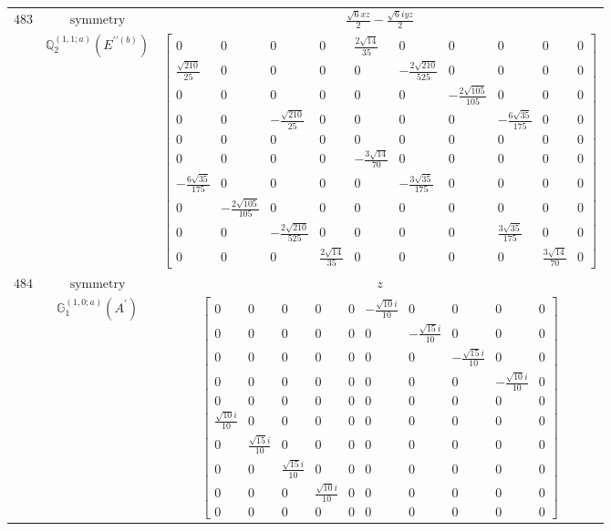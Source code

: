 \documentclass[fleqn,8pt,landscape]{jsarticle}
\begin{document}
\begin{longtable}{ccc}
$ 483 $ & $ \text{symmetry} $ & $ \frac{\sqrt{6} x z}{2} - \frac{\sqrt{6} i y z}{2} $ \\
$  $ & $ \mathbb{Q}_{2}^{(1,1;a)}(E^{\prime\prime(b)}) $ & $ \begin{bmatrix} 0 & 0 & 0 & 0 & \frac{2 \sqrt{14}}{35} & 0 & 0 & 0 & 0 & 0 \\ \frac{\sqrt{210}}{25} & 0 & 0 & 0 & 0 & - \frac{2 \sqrt{210}}{525} & 0 & 0 & 0 & 0 \\ 0 & 0 & 0 & 0 & 0 & 0 & - \frac{2 \sqrt{105}}{105} & 0 & 0 & 0 \\ 0 & 0 & - \frac{\sqrt{210}}{25} & 0 & 0 & 0 & 0 & - \frac{6 \sqrt{35}}{175} & 0 & 0 \\ 0 & 0 & 0 & 0 & 0 & 0 & 0 & 0 & 0 & 0 \\ 0 & 0 & 0 & 0 & - \frac{3 \sqrt{14}}{70} & 0 & 0 & 0 & 0 & 0 \\ - \frac{6 \sqrt{35}}{175} & 0 & 0 & 0 & 0 & - \frac{3 \sqrt{35}}{175} & 0 & 0 & 0 & 0 \\ 0 & - \frac{2 \sqrt{105}}{105} & 0 & 0 & 0 & 0 & 0 & 0 & 0 & 0 \\ 0 & 0 & - \frac{2 \sqrt{210}}{525} & 0 & 0 & 0 & 0 & \frac{3 \sqrt{35}}{175} & 0 & 0 \\ 0 & 0 & 0 & \frac{2 \sqrt{14}}{35} & 0 & 0 & 0 & 0 & \frac{3 \sqrt{14}}{70} & 0 \end{bmatrix} $ \\ \hline
$ 484 $ & $ \text{symmetry} $ & $ z $ \\
$  $ & $ \mathbb{G}_{1}^{(1,0;a)}(A^{\prime}) $ & $ \begin{bmatrix} 0 & 0 & 0 & 0 & 0 & - \frac{\sqrt{10} i}{10} & 0 & 0 & 0 & 0 \\ 0 & 0 & 0 & 0 & 0 & 0 & - \frac{\sqrt{15} i}{10} & 0 & 0 & 0 \\ 0 & 0 & 0 & 0 & 0 & 0 & 0 & - \frac{\sqrt{15} i}{10} & 0 & 0 \\ 0 & 0 & 0 & 0 & 0 & 0 & 0 & 0 & - \frac{\sqrt{10} i}{10} & 0 \\ 0 & 0 & 0 & 0 & 0 & 0 & 0 & 0 & 0 & 0 \\ \frac{\sqrt{10} i}{10} & 0 & 0 & 0 & 0 & 0 & 0 & 0 & 0 & 0 \\ 0 & \frac{\sqrt{15} i}{10} & 0 & 0 & 0 & 0 & 0 & 0 & 0 & 0 \\ 0 & 0 & \frac{\sqrt{15} i}{10} & 0 & 0 & 0 & 0 & 0 & 0 & 0 \\ 0 & 0 & 0 & \frac{\sqrt{10} i}{10} & 0 & 0 & 0 & 0 & 0 & 0 \\ 0 & 0 & 0 & 0 & 0 & 0 & 0 & 0 & 0 & 0 \end{bmatrix} $ \\ \hline

\end{longtable}
\end{document}
